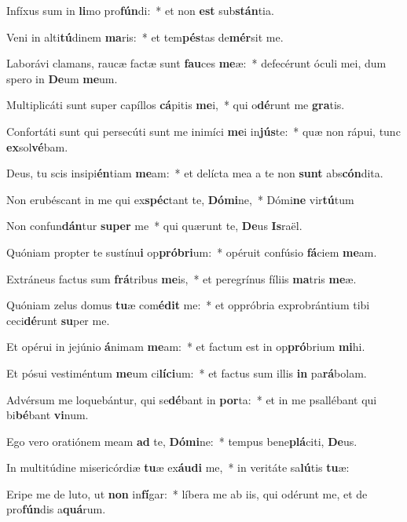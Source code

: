 \item Infíxus sum in \textbf{li}mo pro\textbf{fún}di:~* et non \textbf{est} sub\textbf{stán}tia.
\item Veni in alti\textbf{tú}dinem \textbf{ma}ris:~* et tem\textbf{pés}tas de\textbf{mér}sit me.
\item Laborávi clamans, raucæ factæ sunt \textbf{fau}ces \textbf{me}æ:~* defecérunt óculi mei, dum spero in \textbf{De}um \textbf{me}um.
\item Multiplicáti sunt super capíllos \textbf{cá}pitis \textbf{me}i,~* qui o\textbf{dé}runt me \textbf{gra}tis.
\item Confortáti sunt qui persecúti sunt me inimíci \textbf{me}i in\textbf{jús}te:~* quæ non rápui, tunc \textbf{ex}sol\textbf{vé}bam.
\item Deus, tu scis insipi\textbf{én}tiam \textbf{me}am:~* et delícta mea a te non \textbf{sunt} abs\textbf{cón}dita.
\item Non erubéscant in me qui ex\textbf{spéc}tant te, \textbf{Dó}\textbf{mi}ne,~* Dómi\textbf{ne} vir\textbf{tú}tum
\item Non confun\textbf{dán}tur \textbf{su}\textbf{per} me~* qui quærunt te, \textbf{De}us \textbf{Is}raël.
\item Quóniam propter te sustínu\textbf{i} op\textbf{pró}\textbf{bri}um:~* opéruit confúsio \textbf{fá}ciem \textbf{me}am.
\item Extráneus factus sum \textbf{frá}tribus \textbf{me}is,~* et peregrínus fíliis \textbf{ma}tris \textbf{me}æ.
\item Quóniam zelus domus \textbf{tu}æ com\textbf{é}\textbf{dit} me:~* et oppróbria exprobrántium tibi ceci\textbf{dé}runt \textbf{su}per me.
\item Et opérui in jejúnio \textbf{á}nimam \textbf{me}am:~* et factum est in op\textbf{pró}brium \textbf{mi}hi.
\item Et pósui vestiméntum \textbf{me}um ci\textbf{lí}\textbf{ci}um:~* et factus sum illis \textbf{in} pa\textbf{rá}bolam.
\item Advérsum me loquebántur, qui se\textbf{dé}bant in \textbf{por}ta:~* et in me psallébant qui bi\textbf{bé}bant \textbf{vi}num.
\item Ego vero oratiónem meam \textbf{ad} te, \textbf{Dó}\textbf{mi}ne:~* tempus bene\textbf{plá}citi, \textbf{De}us.
\item In multitúdine misericórdiæ \textbf{tu}æ ex\textbf{áu}\textbf{di} me,~* in veritáte sa\textbf{lú}tis \textbf{tu}æ:
\item Eripe me de luto, ut \textbf{non} in\textbf{fí}gar:~* líbera me ab iis, qui odérunt me, et de pro\textbf{fún}dis a\textbf{quá}rum.
